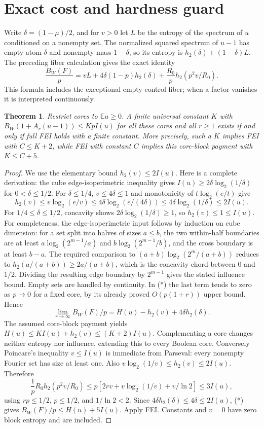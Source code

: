 \documentclass{article}
\newtheorem{theorem}{Theorem}
\begin{document}
\section*{Exact cost and hardness guard}
Write $\delta=(1-\mu)/2$, and for $v>0$ let $L$ be the entropy of the spectrum of $u$ conditioned on a nonempty set. The normalized squared spectrum of $u-1$ has empty atom $\delta$ and nonempty mass $1-\delta$, so its entropy is $h_2(\delta)+(1-\delta)L$. The preceding fiber calculation gives the exact identity
\[\frac{B_W(F)}p=vL+4\delta(1-p)h_2(\delta)+\frac{R_0}p h_2(p^2v/R_0).\tag{*}\]
This formula includes the exceptional empty control fiber; when a factor vanishes it is interpreted continuously.
\begin{theorem}
Restrict cores to $\mathbb Eu\ge0$. A finite universal constant $K$ with $B_W(1+A_r(u-1))\le KpI(u)$ for all these cores and all $r\ge1$ exists if and only if full FEI holds with a finite constant. More precisely, such a $K$ implies FEI with $C\le K+2$, while FEI with constant $C$ implies this core-block payment with $K\le C+5$.
\end{theorem}
\begin{proof}
We use the elementary bound $h_2(v)\le2I(u)$. Here is a complete derivation: the cube edge-isoperimetric inequality gives $I(u)\ge2\delta\log_2(1/\delta)$ for $0<\delta\le1/2$. For $\delta\le1/4$, $v\le4\delta\le1$ and monotonicity of $t\log_2(e/t)$ give
\[h_2(v)\le v\log_2(e/v)\le4\delta\log_2(e/(4\delta))\le4\delta\log_2(1/\delta)\le2I(u).\]
For $1/4\le\delta\le1/2$, concavity shows $2\delta\log_2(1/\delta)\ge1$, so $h_2(v)\le1\le I(u)$. For completeness, the edge-isoperimetric input follows by induction on cube dimension: for a set split into halves of sizes $a\le b$, the two within-half boundaries are at least $a\log_2(2^{m-1}/a)$ and $b\log_2(2^{m-1}/b)$, and the cross boundary is at least $b-a$. The required comparison to $(a+b)\log_2(2^m/(a+b))$ reduces to $h_2(a/(a+b))\ge2a/(a+b)$, which is the concavity chord between $0$ and $1/2$. Dividing the resulting edge boundary by $2^{m-1}$ gives the stated influence bound. Empty sets are handled by continuity.
In (*) the last term tends to zero as $p\to0$ for a fixed core, by its already proved $O(p(1+r))$ upper bound. Hence
\[\lim_{r\to\infty}B_W(F)/p=H(u)-h_2(v)+4\delta h_2(\delta).\]
The assumed core-block payment yields $H(u)\le KI(u)+h_2(v)\le(K+2)I(u)$. Complementing a core changes neither entropy nor influence, extending this to every Boolean core.
Conversely Poincare's inequality $v\le I(u)$ is immediate from Parseval: every nonempty Fourier set has size at least one. Also $v\log_2(1/v)\le h_2(v)\le2I(u)$. Therefore
\[\frac1pR_0h_2(p^2v/R_0)\le p[2rv+v\log_2(1/v)+v/\ln2]\le3I(u),\]
using $rp\le1/2$, $p\le1/2$, and $1/\ln2<2$. Since $4\delta h_2(\delta)\le4\delta\le2I(u)$, (*) gives $B_W(F)/p\le H(u)+5I(u)$. Apply FEI. Constants and $v=0$ have zero block entropy and are included.
\end{proof}
\end{document}
